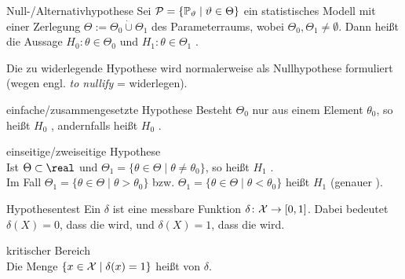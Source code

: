 \begin{Def}{Null-/Alternativhypothese}
    Sei $\mathcal{P} = \{\mathbb{P}_\vartheta \;|\; \vartheta \in \Theta\}$ ein statistisches Modell
    mit einer Zerlegung $\Theta := \Theta_0 \mathbin{\dot{\cup}} \Theta_1$
    des Parameterraums, wobei $\Theta_0, \Theta_1 \not= \emptyset$.
    Dann heißt die Aussage $H_0\colon \theta \in \Theta_0$  und
    $H_1\colon \theta \in \Theta_1$ .
\end{Def}

\begin{Bem}
    Die zu widerlegende Hypothese wird normalerweise als Nullhypothese formuliert
    (wegen engl. \emph{to nullify} = widerlegen).
\end{Bem}

\begin{Def}{einfache/zusammengesetzte Hypothese}
    Besteht $\Theta_0$ nur aus einem Element $\theta_0$, so heißt
    $H_0$ ,
    andernfalls heißt $H_0$ .
\end{Def}

\begin{Def}{einseitige/zweiseitige Hypothese}\\
    Ist $\Theta \subset \real$ und $\Theta_1 = \{\theta \in \Theta \;|\; \theta \not= \theta_0\}$,
    so heißt $H_1$ .\\
    Im Fall $\Theta_1 = \{\theta \in \Theta \;|\; \theta > \theta_0\}$ bzw.
    $\Theta_1 = \{\theta \in \Theta \;|\; \theta < \theta_0\}$
    heißt $H_1$ 
    (genauer ).
\end{Def}

\linie

\begin{Def}{Hypothesentest}
    Ein  $\delta$ ist eine messbare Funktion
    $\delta\colon \mathcal{X} \rightarrow [0, 1]$.
    Dabei bedeutet
    $\delta(X) = 0$, dass die  wird, und
    $\delta(X) = 1$, dass die  wird.
\end{Def}

\begin{Def}{kritischer Bereich}\\
    Die Menge $\{x \in \mathcal{X} \;|\; \delta(x) = 1\}$ heißt
     von $\delta$.
\end{Def}

